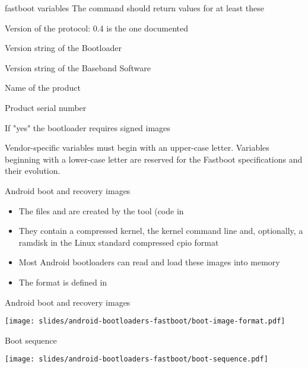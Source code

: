 \begin{frame}{fastboot variables}
  The  command should return values for at least these
  \begin{description}[leftmargin=*,widest=a]
    \item[version] Version of the protocol: 0.4 is the one documented
    \item[version-bootloader] Version string of the Bootloader
    \item[version-baseband] Version string of the Baseband Software
    \item[product] Name of the product
    \item[serialno] Product serial number
    \item[secure] If "yes" the bootloader requires signed images
  \end{description}
  Vendor-specific variables must begin with an upper-case letter.
  Variables beginning with a lower-case letter are reserved for the
  Fastboot specifications and their evolution.
\end{frame}

\begin{frame}{Android boot and recovery images}
  \begin{itemize}
    \item The files  and  are
      created by the tool  (code in
    \item They contain a compressed kernel, the kernel command line
      and, optionally, a ramdisk in the Linux standard compressed cpio
      format
    \item Most Android bootloaders can read and load these images into
      memory
    \item The format is defined in 
  \end{itemize}
\end{frame}

\begin{frame}{Android boot and recovery images}
  \begin{center}
  \texttt{[image: slides/android-bootloaders-fastboot/boot-image-format.pdf]}
  \end{center}
\end{frame}

\begin{frame}{Boot sequence}
  \begin{center}
  \texttt{[image: slides/android-bootloaders-fastboot/boot-sequence.pdf]}
  \end{center}
\end{frame}

